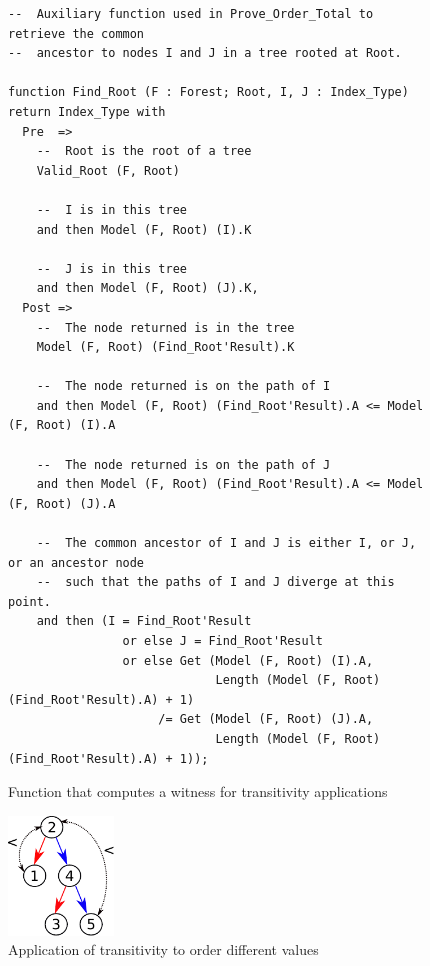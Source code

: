 \documentclass[11pt,a4paper]{article}
\begin{document}
\begin{figure}
\begin{small}
\begin{lstlisting}
--  Auxiliary function used in Prove_Order_Total to retrieve the common
--  ancestor to nodes I and J in a tree rooted at Root.

function Find_Root (F : Forest; Root, I, J : Index_Type) return Index_Type with
  Pre  =>
    --  Root is the root of a tree
    Valid_Root (F, Root)

    --  I is in this tree
    and then Model (F, Root) (I).K

    --  J is in this tree
    and then Model (F, Root) (J).K,
  Post =>
    --  The node returned is in the tree
    Model (F, Root) (Find_Root'Result).K

    --  The node returned is on the path of I
    and then Model (F, Root) (Find_Root'Result).A <= Model (F, Root) (I).A

    --  The node returned is on the path of J
    and then Model (F, Root) (Find_Root'Result).A <= Model (F, Root) (J).A

    --  The common ancestor of I and J is either I, or J, or an ancestor node
    --  such that the paths of I and J diverge at this point.
    and then (I = Find_Root'Result
                or else J = Find_Root'Result
                or else Get (Model (F, Root) (I).A,
                             Length (Model (F, Root) (Find_Root'Result).A) + 1)
                     /= Get (Model (F, Root) (J).A, 
                             Length (Model (F, Root) (Find_Root'Result).A) + 1));
\end{lstlisting}
\end{small}
\caption{\label{fig-proof-wit} Function that computes a witness for transitivity applications}
\end{figure}
\begin{figure}[ht]
\begin{center}
\includegraphics[width=28mm]{transitivity.pdf}
\caption{\label{fig-proof-wit2} Application of transitivity to order different values}
\end{center}
\end{figure}
\end{document}
